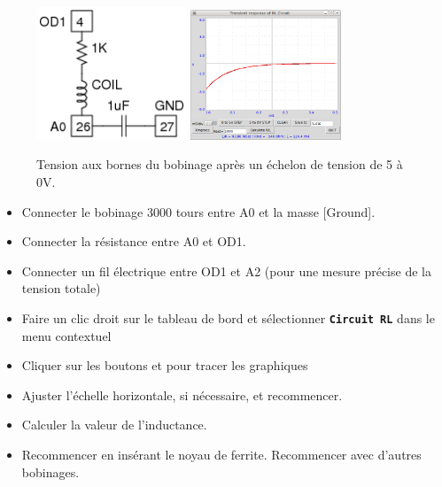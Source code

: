 \documentclass{book}
\newcommand{\nop}{}
\begin{document}
\begin{figure}[h!]
\begin{center}
\caption{\label{fig:LR-circuit.-Voltage}Tension aux bornes du bobinage après un échelon de tension de 5 à 0V. }\vspace{0.5em}
\includegraphics[width=0.4\textwidth, height=0.3\textwidth, keepaspectratio]{Schematic-rl-tran.png}
\includegraphics[width=0.4\textwidth, height=0.3\textwidth, keepaspectratio]{Pic-LR-downstep.png}
\end{center}
\end{figure}



\begin{itemize}
  \item Connecter le bobinage 3000 tours entre A0 et la masse [Ground].
  \item Connecter la résistance entre A0 et OD1.
  \item Connecter un fil électrique entre OD1 et A2 (pour une mesure précise de la tension totale)
  \item Faire un clic droit sur le tableau de bord et sélectionner  \texttt{\textbf{Circuit RL}\nop} dans le menu contextuel
  \item Cliquer sur les boutons   et   pour tracer les graphiques
  \item Ajuster l'échelle horizontale, si nécessaire, et recommencer.
  \item Calculer la valeur de l'inductance.
  \item Recommencer en insérant le noyau de ferrite. Recommencer avec d'autres bobinages.
\end{itemize}
\end{document}
